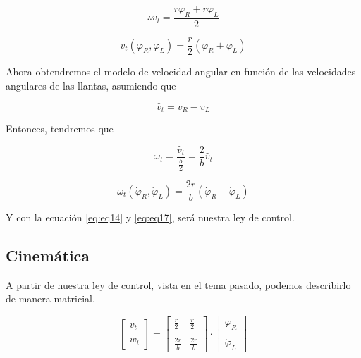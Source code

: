 \documentclass[spanish,10pt,letterpaper, twocolumn]{article}
\begin{document}
\begin{equation*}
	\therefore v_t=\frac{r\dot{\varphi}_R+r\dot{\varphi}_L}{2}
\end{equation*}

\begin{equation}
	\label{eq:eq14}
	v_t(\dot{\varphi}_R,\dot{\varphi}_L)=\frac{r}{2}(\dot{\varphi}_R+\dot{\varphi}_L)
\end{equation}

Ahora obtendremos el modelo de velocidad angular en funci\'on de las velocidades angulares de las llantas, asumiendo que 

\begin{equation}
	\label{eq:eq15}
	\hat{v}_t=v_R-v_L
\end{equation}

Entonces, tendremos que

\begin{equation}
	\label{eq:eq16}
	\omega_t=\frac{\hat{v}_t}{\frac{b}{2}}=\frac{2}{b}\hat{v}_t
\end{equation}

\begin{equation}
	\label{eq:eq17}
	\omega_t(\dot{\varphi}_R,\dot{\varphi}_L)=\frac{2r}{b}(\dot{\varphi}_R-\dot{\varphi}_L)
\end{equation}

Y con la ecuaci\'on \eqref{eq:eq14} y \eqref{eq:eq17}, ser\'a nuestra ley de control.

\subsection{Cinem\'atica}

A partir de nuestra ley de control, vista en el tema pasado, podemos describirlo de manera matricial. 

\begin{equation}
	\label{eq:eq18}
	\begin{bmatrix}
		v_t \\ \\
		w_t
	\end{bmatrix}
	=
	\begin{bmatrix}
		\frac{r}{2} & \frac{r}{2} \\ \\
		\frac{2r}{b} & \frac{2r}{b}
	\end{bmatrix}
	\cdot
	\begin{bmatrix}
		\dot{\varphi}_R \\ \\
		\dot{\varphi}_L
	\end{bmatrix}
\end{equation} 
\end{document}
